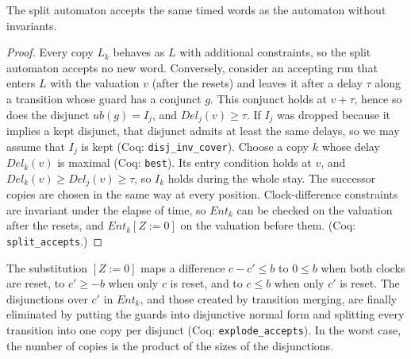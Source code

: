 \begin{theorem}
\label{thm:split}
The split automaton accepts the same timed words as the automaton without
invariants.
\end{theorem}

\begin{proof}
Every copy $L_k$ behaves as $L$ with additional constraints, so the split
automaton accepts no new word.  Conversely, consider an accepting run that
enters $L$ with the valuation $v$ (after the resets) and leaves it after a
delay $\tau$ along a transition whose guard has a conjunct $g$.  This
conjunct holds at $v+\tau$, hence so does the disjunct $\mathit{ub}(g)=I_j$,
and $\mathit{Del}_j(v)\ge\tau$.  If $I_j$ was dropped because it implies a kept disjunct, that disjunct admits
at least the same delays, so we may assume that $I_j$ is kept (Coq:
\texttt{disj\_\allowbreak{}inv\_\allowbreak{}cover}).  Choose a copy $k$ whose delay
$\mathit{Del}_k(v)$ is maximal (Coq: \texttt{best}).  Its entry condition holds at $v$, and
$\mathit{Del}_k(v)\ge \mathit{Del}_j(v)\ge\tau$,
so $I_k$ holds during the whole stay.  The successor copies are chosen in the
same way at every position.  Clock-difference constraints are invariant under
the elapse of time, so $\mathit{Ent}_k$ can be checked on the valuation after the resets,
and $\mathit{Ent}_k[Z:=0]$ on the valuation before them.  (Coq:
\texttt{split\_\allowbreak{}accepts}.)
\end{proof}

The substitution $[Z:=0]$ maps a difference $c-c'\le b$ to $0\le b$ when both
clocks are reset, to $c'\ge -b$ when only $c$ is reset, and to $c\le b$ when
only $c'$ is reset.  The disjunctions over $c'$ in $\mathit{Ent}_k$, and those created by
transition merging, are finally eliminated by putting the guards into
disjunctive normal form and splitting every transition into one copy per
disjunct (Coq: \texttt{explode\_\allowbreak{}accepts}).  In the worst case, the number
of copies is the product of the sizes of the disjunctions.

